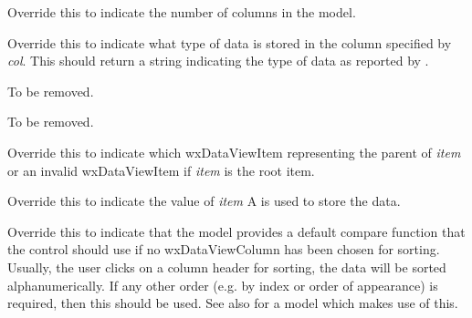 \label{wxdataviewmodelgetcolumncount}


Override this to indicate the number of columns in the model.

\label{wxdataviewmodelgetcolumntype}


Override this to indicate what type of data is stored in the
column specified by {\it col}. This should return a string
indicating the type of data as reported by .

\label{wxdataviewmodelgetfirstchild}


To be removed.

\label{wxdataviewmodelgetnextsibling}


To be removed.

\label{wxdataviewmodelgetparent}


Override this to indicate which wxDataViewItem representing the parent
of {\it item} or an invalid wxDataViewItem if {\it item} is the root item.

\label{wxdataviewmodelgetvalue}


Override this to indicate the value of {\it item}
A  is used to store the data.

\label{wxdataviewmodelhasdefaultcompare}


Override this to indicate that the model provides a default compare
function that the control should use if no wxDataViewColumn has been
chosen for sorting. Usually, the user clicks on a column header for
sorting, the data will be sorted alphanumerically. If any other
order (e.g. by index or order of appearance) is required, then this
should be used. See also 
for a model which makes use of this.

